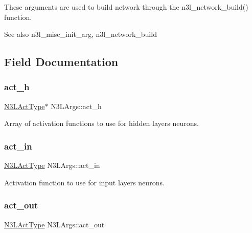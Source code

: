 These arguments are used to build network through the n3l\+\_\+network\+\_\+build() function.

\begin{DoxySeeAlso}{See also}
n3l\+\_\+misc\+\_\+init\+\_\+arg, n3l\+\_\+network\+\_\+build 
\end{DoxySeeAlso}


\subsection{Field Documentation}
\mbox{\label{structN3LArgs_a968aa1ed194fc7bbfaac154bcbf8a405}} 
\subsubsection{\texorpdfstring{act\+\_\+h}{act\_h}}
{\footnotesize\ttfamily \hyperlink{n3__header_8h_a3118e8995213ca26bd388c3d94cd8056}{N3\+L\+Act\+Type}$\ast$ N3\+L\+Args\+::act\+\_\+h}

Array of activation functions to use for hidden layer\textquotesingle{}s neurons. \mbox{\label{structN3LArgs_abb810a671b7a1b20c161e81e309f843c}} 
\subsubsection{\texorpdfstring{act\+\_\+in}{act\_in}}
{\footnotesize\ttfamily \hyperlink{n3__header_8h_a3118e8995213ca26bd388c3d94cd8056}{N3\+L\+Act\+Type} N3\+L\+Args\+::act\+\_\+in}

Activation function to use for input layer\textquotesingle{}s neurons. \mbox{\label{structN3LArgs_ad9d17026b32668acea535143809b16c5}} 
\subsubsection{\texorpdfstring{act\+\_\+out}{act\_out}}
{\footnotesize\ttfamily \hyperlink{n3__header_8h_a3118e8995213ca26bd388c3d94cd8056}{N3\+L\+Act\+Type} N3\+L\+Args\+::act\+\_\+out}

